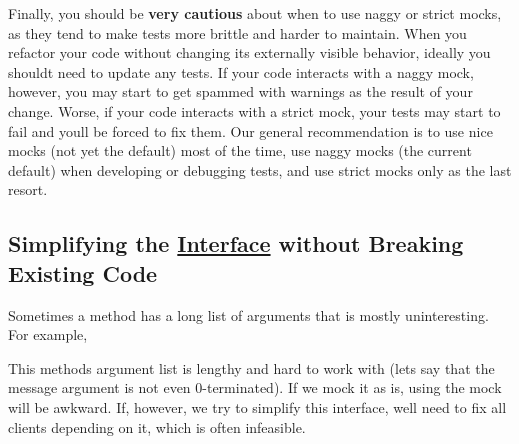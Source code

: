 Finally, you should be {\bfseries{very cautious}} about when to use naggy or strict mocks, as they tend to make tests more brittle and harder to maintain. When you refactor your code without changing its externally visible behavior, ideally you should\textquotesingle{}t need to update any tests. If your code interacts with a naggy mock, however, you may start to get spammed with warnings as the result of your change. Worse, if your code interacts with a strict mock, your tests may start to fail and you\textquotesingle{}ll be forced to fix them. Our general recommendation is to use nice mocks (not yet the default) most of the time, use naggy mocks (the current default) when developing or debugging tests, and use strict mocks only as the last resort.

\subsection*{Simplifying the \mbox{\hyperlink{class_interface}{Interface}} without Breaking Existing Code}

Sometimes a method has a long list of arguments that is mostly uninteresting. For example,


\begin{DoxyCode}{0}
\DoxyCodeLine{ \textcolor{keyword}{public}:}
\DoxyCodeLine{\};}
\end{DoxyCode}


This method\textquotesingle{}s argument list is lengthy and hard to work with (let\textquotesingle{}s say that the {\ttfamily message} argument is not even 0-\/terminated). If we mock it as is, using the mock will be awkward. If, however, we try to simplify this interface, we\textquotesingle{}ll need to fix all clients depending on it, which is often infeasible.

